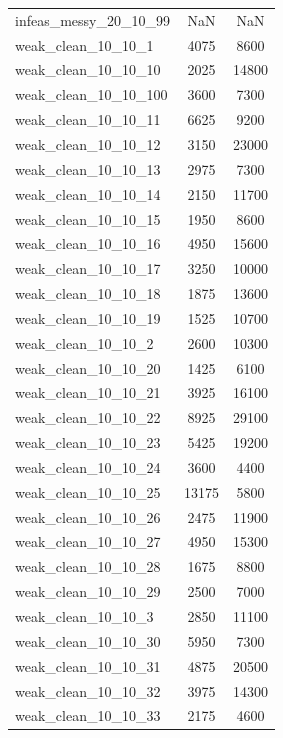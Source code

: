 \begin{longtable}{lcc}
infeas\_messy\_20\_10\_99  &      NaN &    NaN \\
weak\_clean\_10\_10\_1     &     4075 &   8600 \\
weak\_clean\_10\_10\_10    &     2025 &  14800 \\
weak\_clean\_10\_10\_100   &     3600 &   7300 \\
weak\_clean\_10\_10\_11    &     6625 &   9200 \\
weak\_clean\_10\_10\_12    &     3150 &  23000 \\
weak\_clean\_10\_10\_13    &     2975 &   7300 \\
weak\_clean\_10\_10\_14    &     2150 &  11700 \\
weak\_clean\_10\_10\_15    &     1950 &   8600 \\
weak\_clean\_10\_10\_16    &     4950 &  15600 \\
weak\_clean\_10\_10\_17    &     3250 &  10000 \\
weak\_clean\_10\_10\_18    &     1875 &  13600 \\
weak\_clean\_10\_10\_19    &     1525 &  10700 \\
weak\_clean\_10\_10\_2     &     2600 &  10300 \\
weak\_clean\_10\_10\_20    &     1425 &   6100 \\
weak\_clean\_10\_10\_21    &     3925 &  16100 \\
weak\_clean\_10\_10\_22    &     8925 &  29100 \\
weak\_clean\_10\_10\_23    &     5425 &  19200 \\
weak\_clean\_10\_10\_24    &     3600 &   4400 \\
weak\_clean\_10\_10\_25    &    13175 &   5800 \\
weak\_clean\_10\_10\_26    &     2475 &  11900 \\
weak\_clean\_10\_10\_27    &     4950 &  15300 \\
weak\_clean\_10\_10\_28    &     1675 &   8800 \\
weak\_clean\_10\_10\_29    &     2500 &   7000 \\
weak\_clean\_10\_10\_3     &     2850 &  11100 \\
weak\_clean\_10\_10\_30    &     5950 &   7300 \\
weak\_clean\_10\_10\_31    &     4875 &  20500 \\
weak\_clean\_10\_10\_32    &     3975 &  14300 \\
weak\_clean\_10\_10\_33    &     2175 &   4600 \\

\end{longtable}
